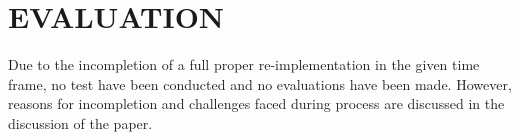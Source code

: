 \chapter{EVALUATION}

Due to the incompletion of a full proper re-implementation in the given time frame, no test have been conducted and no evaluations have been made. However, reasons for incompletion and challenges faced during process are discussed in the discussion of the paper.